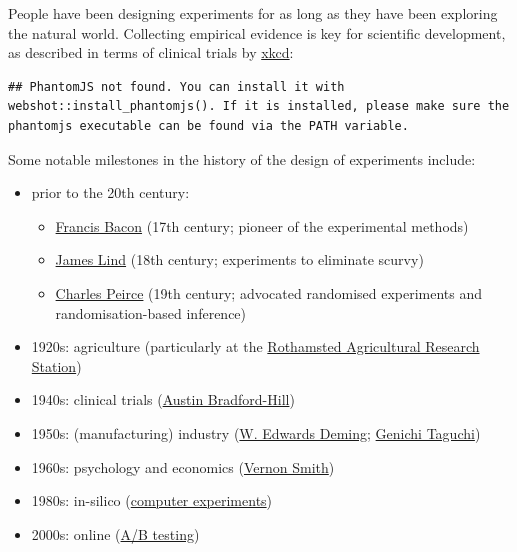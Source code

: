 \documentclass[
]{book}
\providecommand{\tightlist}{%
  \setlength{\itemsep}{0pt}\setlength{\parskip}{0pt}}
\theoremstyle{definition}
\theoremstyle{definition}
\theoremstyle{definition}
\theoremstyle{definition}
\theoremstyle{remark}
\begin{document}
People have been designing experiments for as long as they have been exploring the natural world. Collecting empirical evidence is key for scientific development, as described in terms of clinical trials by \href{https://xkcd.com/2530/}{xkcd}:

\begin{verbatim}
## PhantomJS not found. You can install it with webshot::install_phantomjs(). If it is installed, please make sure the phantomjs executable can be found via the PATH variable.
\end{verbatim}

Some notable milestones in the history of the design of experiments include:

\begin{itemize}
\tightlist
\item
  prior to the 20th century:

  \begin{itemize}
  \tightlist
  \item
    \href{https://en.wikipedia.org/wiki/Baconian_method}{Francis Bacon} (17th century; pioneer of the experimental methods)
  \item
    \href{https://en.wikipedia.org/wiki/James_Lind}{James Lind} (18th century; experiments to eliminate scurvy)
  \item
    \href{https://en.wikipedia.org/wiki/Charles_Sanders_Peirce\#Probability_and_statistics}{Charles Peirce} (19th century; advocated randomised experiments and randomisation-based inference)
  \end{itemize}
\item
  1920s: agriculture (particularly at the \href{https://www.rothamsted.ac.uk/history-and-heritage}{Rothamsted Agricultural Research Station})
\item
  1940s: clinical trials (\href{https://en.wikipedia.org/wiki/Austin_Bradford_Hill}{Austin Bradford-Hill})
\item
  1950s: (manufacturing) industry (\href{https://en.wikipedia.org/wiki/W._Edwards_Deming}{W. Edwards Deming}; \href{https://en.wikipedia.org/wiki/Genichi_Taguchi}{Genichi Taguchi})
\item
  1960s: psychology and economics (\href{https://en.wikipedia.org/wiki/Vernon_L._Smith}{Vernon Smith})
\item
  1980s: in-silico (\href{https://en.wikipedia.org/wiki/Computer_experiment}{computer experiments})
\item
  2000s: online (\href{https://en.wikipedia.org/wiki/A/B_testing}{A/B testing})
\end{itemize}
\end{document}
